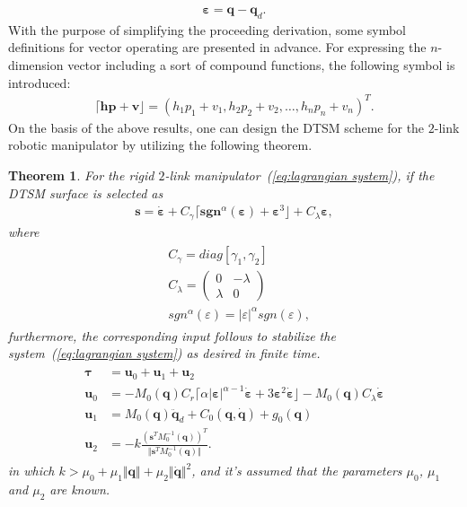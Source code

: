 \documentclass[3p]{elsarticle}
\theoremstyle{plain}
\newtheorem{mythm}{Theorem}
\theoremstyle{remark}
\begin{document}
\begin{align}
\bm \varepsilon = \bm q -\bm q_d.
\end{align}
With the purpose of simplifying the proceeding derivation, some symbol definitions for vector operating are presented in advance. For expressing the $n$-dimension vector including a sort of compound functions, the following symbol is introduced:
\begin{align*}
\lceil\bm h\bm p+\bm v\rfloor = (h_1p_1+v_1,h_2p_2+v_2,\ldots,h_np_n+v_n)^T.
\end{align*}
On the basis of the above results, one can design the DTSM scheme for the $2$-link robotic manipulator by utilizing the following theorem.
\begin{mythm}\label{theorem:4}
For the rigid $2$-link manipulator~(\ref{eq:lagrangian system}), if the DTSM surface is selected as
\begin{align}
\bm s = \dot{\bm \varepsilon}+C_\gamma\lceil\bm{sgn}^\alpha(\bm \varepsilon)+\bm\varepsilon^3\rfloor+C_\lambda{\bm\varepsilon},\label{eq:lagrangian surface}
\end{align}
where
\begin{align}
\begin{split}
&C_\gamma=diag[\gamma_1,\gamma_2]\\
&C_\lambda=
\begin{pmatrix}
0 &-\lambda\\ \lambda &0
\end{pmatrix}\\
&{sgn}^\alpha(\varepsilon)=\vert\varepsilon\vert^\alpha sgn(\varepsilon),
\end{split}
\end{align}
furthermore, the corresponding input follows to stabilize the system~(\ref{eq:lagrangian system}) as desired in finite time.
\begin{align}
\begin{split}
\bm\tau &= \bm u_0+\bm u_1 +\bm u_2\\
\bm u_0 &= -M_0(\bm q)C_r\lceil\alpha\vert\bm\varepsilon\vert^{\alpha-1}\dot{\bm \varepsilon}+3\bm \varepsilon^2\dot{\bm \varepsilon}\rfloor-M_0(\bm q)C_\lambda\dot{\bm \varepsilon}\\
\bm u_1 &= M_0(\bm q)\ddot {\bm q}_d+C_0(\bm q,\dot {\bm q})+g_0(\bm q)\\
\bm u_2 &= -k\frac{(\bm s^TM_0^{-1}(\bm q))^T}{\Vert\bm s^TM_0^{-1}(\bm q)\Vert}.
\end{split}
\end{align}
in which $k>\mu_0+\mu_1\Vert\bm q\Vert+\mu_2\Vert\dot{\bm q}\Vert^2$, and it's assumed that the parameters $\mu_0$, $\mu_1$ and $\mu_2$ are known.
\end{mythm}
\end{document}
